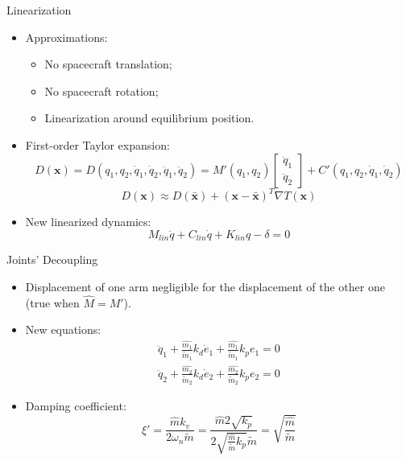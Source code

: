 \begin{frame}{Linearization}
  \begin{itemize}
    \item Approximations:
    \begin{itemize}
      \item No spacecraft translation;
      \item No spacecraft rotation;
      \item Linearization around equilibrium position.
    \end{itemize}
    \item First-order Taylor expansion:
    \begin{equation}
      D(\textbf{x})=D(q_1,q_2,\dot{q}_1,\dot{q}_2,\ddot{q}_1,\ddot{q}_2)=M'(q_1,q_2)\begin{bmatrix}
        \ddot{q}_1\\
        \ddot{q}_2
      \end{bmatrix}+C'(q_1,q_2,\dot{q}_1,\dot{q}_2)
    \end{equation}
    \begin{equation}
      D(\textbf{x})\approx D(\bar{\textbf{x}})+(\textbf{x}-\bar{\textbf{x}})^T\nabla T(\textbf{x})
    \end{equation}
    \item New linearized dynamics:
    \begin{equation}
      M_{lin}\ddot{q}+C_{lin}\dot{q}+K_{lin}q-\delta=0
    \end{equation}
  \end{itemize}
\end{frame}

\begin{frame}{Joints' Decoupling}
  \begin{itemize}
    \item Displacement of one arm negligible for the displacement of the other one (true when $\hat{M}=M'$).
    \item New equations:
    \begin{equation}
      \begin{array}{l}
        \ddot{q}_1+\frac{\hat{m_1}}{\tilde{m}_1}k_d\dot{e}_1+\frac{\hat{m_1}}{\tilde{m}_1}k_p e_1=0\\
        \ddot{q}_2+\frac{\hat{m_2}}{\tilde{m}_2}k_d\dot{e}_2+\frac{\hat{m_2}}{\tilde{m}_2}k_p e_2=0
      \end{array}
    \end{equation}
    \item Damping coefficient:
    \begin{equation}
      \xi'=\frac{\hat{m}k_v}{2\omega_n \tilde{m}}=\frac{\hat{m}2\sqrt{k_p}}{2\sqrt{\frac{\hat{m}}{\tilde{m}}k_p} \tilde{m}}=\sqrt{\frac{\hat{m}}{\tilde{m}}}
      \label{mass_relation}
    \end{equation}
  \end{itemize}
\end{frame}

